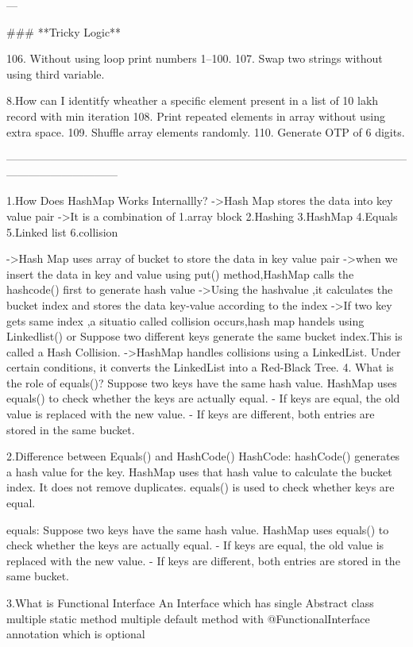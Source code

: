 ---

### **Tricky Logic**

106. Without using loop print numbers 1–100.
107. Swap two strings without using third variable.


8.How can I identitfy wheather a specific element present in a list of 10 lakh record with min iteration
108. Print repeated elements in array without using extra space.
109. Shuffle array elements randomly.
110. Generate OTP of 6 digits.



------------------------------------------------------------------------------------------------------------------------------------------

1.How Does HashMap Works Internallly?
	->Hash Map stores the data into key value pair
	->It is a combination of 
			1.array block
			2.Hashing
			3.HashMap
			4.Equals 
			5.Linked list
			6.collision
			
	->Hash Map uses array of bucket to store the data in key value pair
	->when we insert the data in key and value using put() method,HashMap calls the hashcode() first to generate hash value
	->Using the hashvalue ,it calculates the bucket index and stores the data key-value according to the index
	->If two key gets same index ,a situatio called collision occurs,hash map handels using Linkedlist() or
	Suppose two different keys generate the same bucket index.This is called a Hash Collision.
	->HashMap handles collisions using a LinkedList. Under certain conditions, it converts the LinkedList into a Red-Black Tree.
	4. What is the role of equals()?
    Suppose two keys have the same hash value.
	HashMap uses equals() to check whether the keys are actually equal.
	- If keys are equal, the old value is replaced with the new value.
	- If keys are different, both entries are stored in the same bucket.
	
2.Difference between Equals() and HashCode()
	HashCode:
		hashCode() generates a hash value for the key.
		HashMap uses that hash value to calculate the bucket index.
		It does not remove duplicates.
		equals() is used to check whether keys are equal.
		
	equals:	
		 Suppose two keys have the same hash value.
		HashMap uses equals() to check whether the keys are actually equal.
		- If keys are equal, the old value is replaced with the new value.
		- If keys are different, both entries are stored in the same bucket.
		
3.What is Functional Interface
		An Interface which has single Abstract class
		multiple static method
		multiple default method
		with @FunctionalInterface annotation which is optional
		
